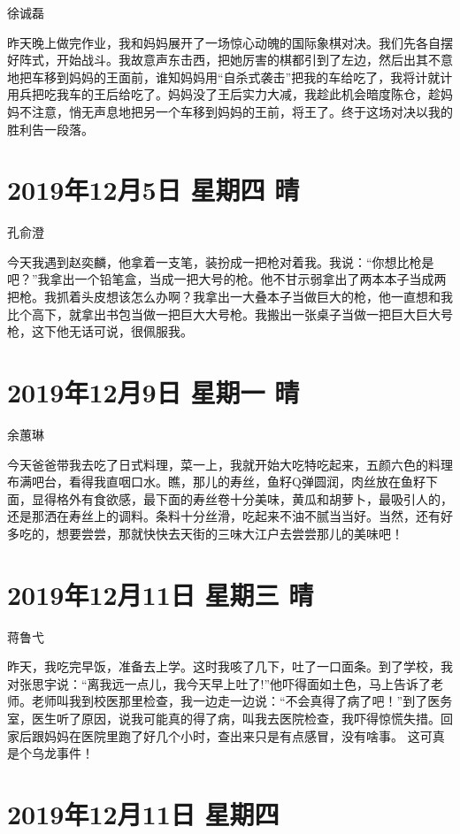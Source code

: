 徐诚磊

昨天晚上做完作业，我和妈妈展开了一场惊心动魄的国际象棋对决。我们先各自摆好阵式，开始战斗。我故意声东击西，把她厉害的棋都引到了左边，然后出其不意地把车移到妈妈的王面前，谁知妈妈用``自杀式袭击''把我的车给吃了，我将计就计用兵把吃我车的王后给吃了。妈妈没了王后实力大减，我趁此机会暗度陈仓，趁妈妈不注意，悄无声息地把另一个车移到妈妈的王前，将王了。终于这场对决以我的胜利告一段落。

\section{2019年12月5日 星期四 晴}

孔俞澄

今天我遇到赵奕麟，他拿着一支笔，装扮成一把枪对着我。我说：``你想比枪是吧？''我拿出一个铅笔盒，当成一把大号的枪。他不甘示弱拿出了两本本子当成两把枪。我抓着头皮想该怎么办啊？我拿出一大叠本子当做巨大的枪，他一直想和我比个高下，就拿出书包当做一把巨大大号枪。我搬出一张桌子当做一把巨大巨大号枪，这下他无话可说，很佩服我。

\section{2019年12月9日 星期一 晴}

余蕙琳

今天爸爸带我去吃了日式料理，菜一上，我就开始大吃特吃起来，五颜六色的料理布满吧台，看得我直咽口水。瞧，那儿的寿丝，鱼籽Q弹圆润，肉丝放在鱼籽下面，显得格外有食欲感，最下面的寿丝卷十分美味，黄瓜和胡萝卜，最吸引人的，还是那洒在寿丝上的调料。条料十分丝滑，吃起来不油不腻当当好。当然，还有好多吃的，想要尝尝，那就快快去天街的三味大江户去尝尝那儿的美味吧！

\section{2019年12月11日 星期三 晴}

蒋鲁弋

昨天，我吃完早饭，准备去上学。这时我咳了几下，吐了一口面条。到了学校，我对张思宇说：``离我远一点儿，我今天早上吐了!''他吓得面如土色，马上告诉了老师。老师叫我到校医那里检查，我一边走一边说：``不会真得了病了吧！''到了医务室，医生听了原因，说我可能真的得了病，叫我去医院检查，我吓得惊慌失措。回家后跟妈妈在医院里跑了好几个小时，查出来只是有点感冒，没有啥事。
这可真是个乌龙事件！

\section{2019年12月11日 星期四}

